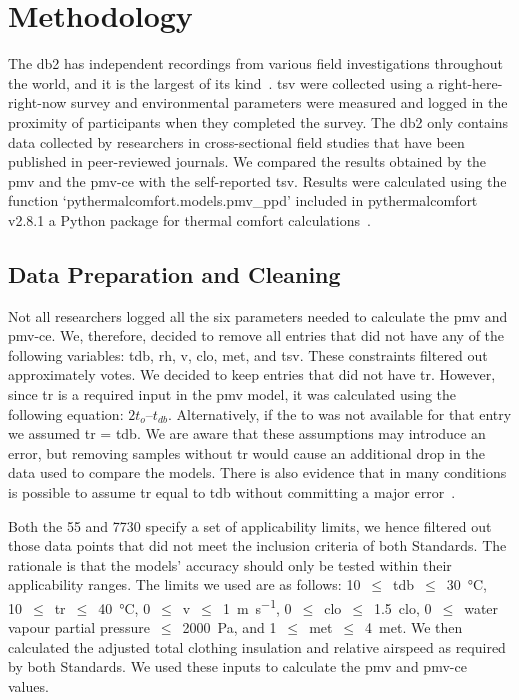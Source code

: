 \section{Methodology}\label{sec:methodology}
The \ac{db2} has  independent recordings from various field investigations throughout the world, and it is the largest of its kind~\cite{FoldvaryLicina2018, db2dryad}.
\Ac{tsv} were collected using a right-here-right-now survey and environmental parameters were measured and logged in the proximity of participants when they completed the survey.
The \ac{db2} only contains data collected by researchers in cross-sectional field studies that have been published in peer-reviewed journals.
 We compared the results obtained by the \ac{pmv} and the \ac{pmv-ce} with the self-reported \ac{tsv}.
Results were calculated using the function `pythermalcomfort.models.pmv\_ppd' included in pythermalcomfort v2.8.1 a Python package for thermal comfort calculations~\cite{Tartarini2020a}.

\subsection{Data Preparation and Cleaning}\label{subsec:data-processing-and-cleaning}
Not all researchers logged all the six parameters needed to calculate the \ac{pmv} and \ac{pmv-ce}.
We, therefore, decided to remove all entries that did not have any of the following variables: \ac{tdb}, \ac{rh}, \ac{v}, \ac{clo}, \ac{met}, and \ac{tsv}.
These constraints filtered out approximately  votes.
We decided to keep entries that did not have \ac{tr}.
However, since \ac{tr} is a required input in the \ac{pmv} model, it was calculated using the following equation: $2 t_{o} – t_{db}$.
Alternatively, if the \ac{to} was not available for that entry we assumed \ac{tr} = \ac{tdb}.
We are aware that these assumptions may introduce an error, but removing samples without \ac{tr} would cause an additional  drop in the data used to compare the models.
There is also evidence that in many conditions is possible to assume \ac{tr} equal to \ac{tdb} without committing a major error~\cite{Dawe2020}.

Both the \gls{55} and \gls{7730} specify a set of applicability limits, we hence filtered out those data points that did not meet the inclusion criteria of both Standards.
The rationale is that the models' accuracy should only be tested within their applicability ranges.
The limits we used are as follows:
\num{10}~$\leq$~\ac{tdb}~$\leq$~\qty{30}{\celsius},
\num{10}~$\leq$~\ac{tr}~$\leq$~\qty{40}{\celsius},
\num{0}~$\leq$~\ac{v}~$\leq$~\qty{1}{\m\per\s},
\num{0}~$\leq$~\ac{clo}~$\leq$~\qty{1.5}{clo},
\num{0}~$\leq$~water vapour partial pressure~$\leq$~\qty{2000}{\pascal},
and \num{1}~$\leq$~\ac{met}~$\leq$~\qty{4}{met}.
We then calculated the adjusted total clothing insulation and relative airspeed as required by both Standards.
We used these inputs to calculate the \ac{pmv} and \ac{pmv-ce} values.


